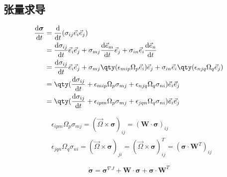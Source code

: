 \subsection{张量求导}
\begin{equation}
  \begin{split}
    \frac{\mathrm{d}\boldsymbol{\sigma}}{\mathrm{d}t}&=\frac{\mathrm{d}}{\mathrm{d}t}(\sigma_{ij}\vec{e}_i\vec{e}_j)\\
    &=\frac{\mathrm{d}\sigma_{ij}}{\mathrm{d}t}\vec{e}_i\vec{e}_j+\sigma_{mj}\frac{\mathrm{d}\vec{e}_m}{\mathrm{d}t}\vec{e}_j+\sigma_{in}\vec{e}_i\frac{\mathrm{d}\vec{e}_n}{\mathrm{d}t}\\
    &=\frac{\mathrm{d}\sigma_{ij}}{\mathrm{d}t}\vec{e}_i\vec{e}_j+\sigma_{mj}\qty(\epsilon_{mip}\Omega_p\vec{e}_i)\vec{e}_j+\sigma_{in}\vec{e}_i\qty(\epsilon_{njq}\Omega_q\vec{e}_j)\\
    &=\qty(\frac{\mathrm{d}\sigma_{ij}}{\mathrm{d}t}+\epsilon_{mip}\Omega_p\sigma_{mj}+\epsilon_{njq}\Omega_q\sigma_{ni})\vec{e}_i\vec{e}_j\\
    &=\qty(\frac{\mathrm{d}\sigma_{ij}}{\mathrm{d}t}+\epsilon_{ipm}\Omega_p\sigma_{mj}+\epsilon_{jqn}\Omega_q\sigma_{ni})\vec{e}_i\vec{e}_j
  \end{split}
\end{equation}

\begin{align}
  &\epsilon_{ipm}\Omega_p\sigma_{mj}=(\vec{\Omega}\times\boldsymbol{\sigma})_{ij}=(\textbf{W}\cdot\boldsymbol{\sigma})_{ij}\\
  &\epsilon_{jqn}\Omega_q\sigma_{ni}=(\vec{\Omega}\times\boldsymbol{\sigma})_{ji}=(\vec{\Omega}\times\boldsymbol{\sigma})^T_{ij}=(\boldsymbol{\sigma}\cdot\textbf{W}^T)_{ij}
\end{align}

\begin{equation}
  \dot{\boldsymbol{\sigma}}=\boldsymbol{\sigma}^{\nabla J}+\textbf{W}\cdot\boldsymbol{\sigma}+\boldsymbol{\sigma}\cdot\textbf{W}^{T}
\end{equation}